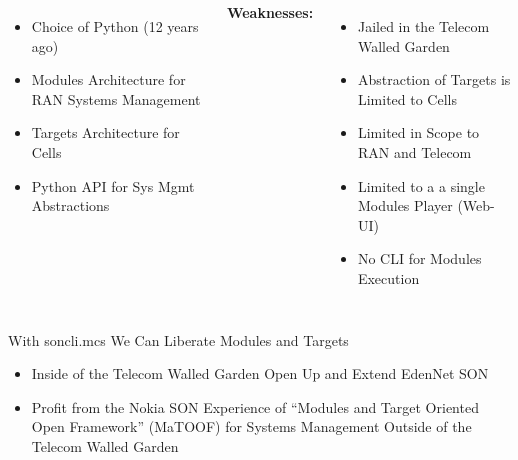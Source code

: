 \begin{whenOrg}
\begin{verblatex}
\begin{frame}[fragile,plain,label=edenNetSonStrength]
\begin{small}
\begin{columns}[T]
\begin{itemize}
  \item Choice of Python (12 years ago)
  \item Modules Architecture for RAN Systems Management
  \item Targets Architecture for Cells
  \item Python API for Sys Mgmt Abstractions
\end{itemize}


   \begin{center}
      \colorbox{blue!60}{\color{white} \textbf{Weaknesses:}}
    \end{center}

    \begin{itemize}
      \item Jailed in the Telecom Walled Garden
      \item Abstraction of Targets is Limited to Cells
      \item Limited in Scope to RAN and Telecom
      \item Limited to a a single Modules Player (Web-UI)
      \item No CLI for Modules Execution

    \end{itemize}

\end{columns}
\end{small}

\begin{exampleblock}{With soncli.mcs We Can Liberate Modules and Targets}
  \begin{itemize}
    \item Inside of the Telecom Walled Garden Open Up and Extend EdenNet SON
    \item Profit from the Nokia SON Experience of ``Modules and Target Oriented Open Framework''
          (MaTOOF) for Systems Management Outside of the  Telecom Walled Garden
  \end{itemize}
\end{exampleblock}



\end{frame}
\end{verblatex}





\end{whenOrg}
